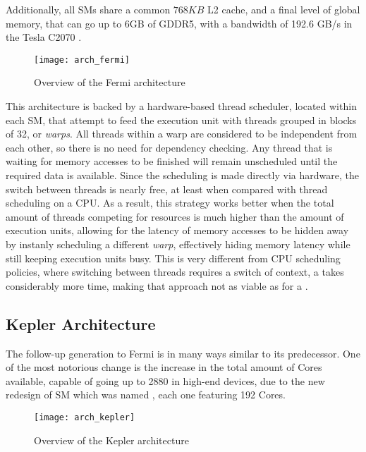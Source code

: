 \documentclass[main.tex]{subfiles}
\begin{document}
Additionally, all \acsp{SM} share a common $768KB$ L2 cache, and a final level of global memory, that can go up to 6GB of GDDR5, with a bandwidth of 192.6 GB/s in the Tesla C2070 \cite{NVIDIA:fermi}.

\begin{figure}[!htp]
  \centering
  \texttt{[image: arch\_fermi]}
  \caption{Overview of the Fermi architecture \label{fig:fermi}}
\end{figure}

This architecture is backed by a hardware-based thread scheduler, located within each \acs{SM}, that attempt to feed the execution unit with threads grouped in blocks of 32, or \textit{warps}. All threads within a warp are considered to be independent from each other, so there is no need for dependency checking. Any thread that is waiting for memory accesses to be finished will remain unscheduled until the required data is available. Since the scheduling is made directly via hardware, the switch between threads is nearly free, at least when compared with thread scheduling on a \acs{CPU}. As a result, this strategy works better when the total amount of threads competing for resources is much higher than the amount of execution units, allowing for the latency of memory accesses to be hidden away by instanly scheduling a different \textit{warp}, effectively hiding memory latency while still keeping execution units busy. This is very different from \acs{CPU} scheduling policies, where switching between threads requires a switch of context, a takes considerably more time, making that approach not as viable as for a \gpus.



\subsection{\nvidia Kepler Architecture}

The follow-up generation to Fermi is in many ways similar to its predecessor. One of the most notorious change is the increase in the total amount of \cuda Cores available, capable of going up to 2880 in high-end devices, due to the new redesign of \acl{SM} which was named \smx, each one featuring 192 \cuda Cores.

\begin{figure}
  \centering
  \texttt{[image: arch\_kepler]}
  \caption{Overview of the Kepler architecture \label{fig:kepler}}
\end{figure}
\end{document}
